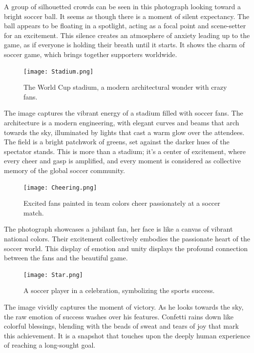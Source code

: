 \documentclass[11pt,a4paper,oneside]{report}
\begin{document}
A group of silhouetted crowds can be seen in this photograph looking toward a bright soccer ball.
It seems as though there is a moment of silent expectancy. 
The ball appears to be floating in a spotlight, acting as a focal point and scene-setter for an excitement.
This silence creates an atmosphere of anxiety leading up to the game, as if everyone is holding their breath until it starts. 
It shows the charm of soccer game, which brings together supporters worldwide.

\newpage

\begin{figure}[htbp]
  \centering
  \texttt{[image: Stadium.png]}
  \caption{The World Cup stadium, a modern architectural wonder with crazy fans.}
\end{figure}

The image captures the vibrant energy of a stadium filled with soccer fans. 
The architecture is a modern engineering, with elegant curves and beams that arch towards the sky, illuminated by lights that cast a warm glow over the attendees. 
The field is a bright patchwork of greens, set against the darker hues of the spectator stands.
This is more than a stadium; it's a center of excitement, where every cheer and gasp is amplified, and every moment is considered as collective memory of the global soccer community.

\newpage

\begin{figure}[htbp]
  \centering
  \texttt{[image: Cheering.png]}
  \caption{Excited fans painted in team colors cheer passionately at a soccer match.}
\end{figure}

The photograph showcases a jubilant fan, her face is like a canvas of vibrant national colors.
Their excitement collectively embodies the passionate heart of the soccer world. 
This display of emotion and unity displays the profound connection between the fans and the beautiful game.

\newpage

\begin{figure}[htbp]
  \centering
  \texttt{[image: Star.png]}
  \caption{A soccer player in a celebration, symbolizing the sports success.}
\end{figure}

The image vividly captures the moment of victory. 
As he looks towards the sky, the raw emotion of success washes over his features.
Confetti rains down like colorful blessings, blending with the beads of sweat and tears of joy that mark this achievement. 
It is a snapshot that touches upon the deeply human experience of reaching a long-sought goal.
\end{document}
